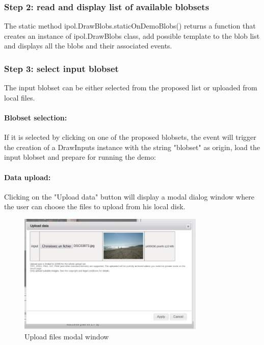 \subsubsection{Step 2: read and display list of available blobsets}

The static method ipol.DrawBlobs.staticOnDemoBlobs() returns a function
that creates an instance of ipol.DrawBlobs class, add possible template
to the blob list and displays all the blobs and their associated events.

\subsubsection{Step 3: select input blobset}

The input blobset can be either selected from the proposed list or uploaded from 
local files.
\paragraph{Blobset selection:}
If it is selected by clicking on one of the proposed blobsets, the event will
trigger the creation of a DrawInputs instance with the string "blobset" as origin,
load the input blobset and prepare for running the demo:
%

\paragraph{Data upload:}

Clicking on the "Upload data" button will display a modal dialog window
where the user can choose the files to upload from his local disk.
\begin{figure}[H]
  \centering
  \includegraphics[width=3.5in]{Images/uploadwindow_capture}
  \caption{Upload files modal window}
  \label{img:uploadwindow_snapshot}
\end{figure}

